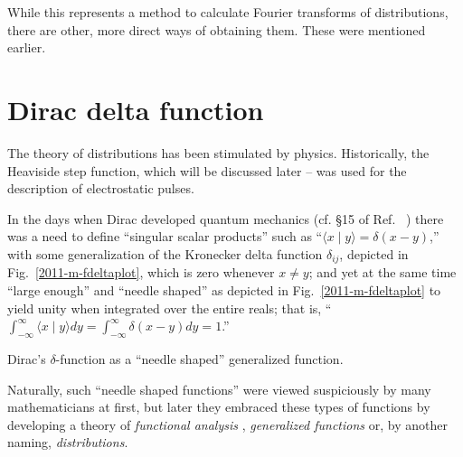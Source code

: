 While this represents a method to calculate  Fourier transforms of distributions, there are other, more direct ways of
obtaining them.
These were mentioned earlier.




\section{Dirac  delta function}



The theory of distributions has been stimulated by physics.
Historically, the Heaviside step function, which will be discussed later --
was used for the description of electrostatic pulses.

In the days when Dirac developed quantum mechanics
(cf. \S 15 of Ref.~ \cite[-10mm]{dirac})
there was a need to define
``singular scalar products'' such as ``$\langle x \mid y \rangle = \delta (x-y)$,''
with some generalization of the Kronecker delta function $\delta_{ij}$, depicted in Fig.~\ref{2011-m-fdeltaplot},
which is zero whenever $x\neq y$;
and yet at the same time ``large enough'' and
``needle shaped'' as depicted in Fig.~\ref{2011-m-fdeltaplot} to yield unity when
integrated over the entire reals; that is, ``$\int_{-\infty}^\infty \langle x \mid y \rangle dy =\int_{-\infty}^\infty \delta (x-y) dy =1$.''
\begin{marginfigure}%
\begin{center}
\end{center}
\caption{Dirac's $\delta$-function as a ``needle shaped'' generalized function.}
  \label{2011-m-fdeltaplot}
\end{marginfigure}


Naturally, such ``needle shaped functions'' were viewed suspiciously by many mathematicians
at first, but later they embraced these types of functions
\cite[10mm]{gelfand:1964:gf} by developing a theory of
{\em functional analysis}
,
{\em generalized functions}
or, by another naming,
{\em distributions}.

